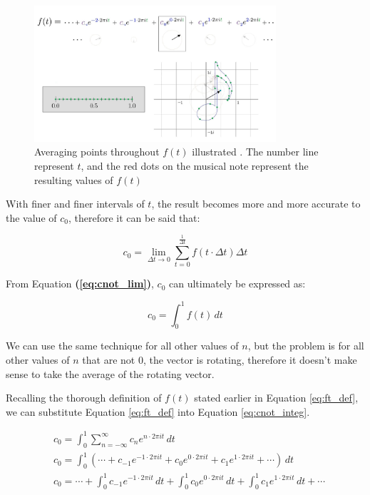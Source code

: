 \documentclass[letterpaper, 12pt]{article}
\begin{document}
\begin{figure}[H]
    \centering
    \includegraphics[width=0.8\textwidth]{cnot_integ.jpeg}
    \caption{Averaging points throughout \protect\(f(t)\) illustrated \protect\cite{sandersonWhatFourierSeries2019}. The number line represent \protect\(t\), and the red dots on the musical note represent the resulting values of \protect\(f(t)\)}
    \label{fig:cnot_integ}
\end{figure}

With finer and finer intervals of \(t\), the result
becomes more and more accurate to the value of \(c_0\), therefore it can be
said that:

\begin{equation}
    c_0 = \lim_{\Delta t \to 0} \sum_{t = 0}^{\frac{1}{\Delta t}} f(t \cdot \Delta t) \Delta t
    \label{eq:cnot_lim}
\end{equation}

From Equation \textbf{(\ref*{eq:cnot_lim})}, \(c_0\) can ultimately be expressed as:

\begin{equation}
    c_0 = \int_{0}^{1} f(t) \,dt
    \label{eq:cnot_integ}
\end{equation}


We can use the same technique for all other values of \(n\), but the problem is
for all other values of \(n\) that are not 0, the vector is rotating, therefore
it doesn't make sense to take the average of the rotating vector.

Recalling the thorough definition of \(f(t)\) stated earlier in Equation \ref*{eq:ft_def},
we can substitute Equation \ref*{eq:ft_def} into Equation \ref*{eq:cnot_integ}.

\begin{align*}
     & c_0 = \int_{0}^{1} \sum_{n=-\infty}^{\infty} c_n e^{n \cdot 2\pi it} \,dt
    \\
     & c_0 = \int_{0}^{1} \left( \cdots + c_{-1} e^{-1 \cdot 2\pi it} + c_{0} e^{0 \cdot 2\pi it} + c_{1} e^{1 \cdot 2\pi it} + \cdots \right) \,dt
    \\
     & c_0 = \cdots + \int_{0}^{1} c_{-1} e^{-1 \cdot 2\pi it} \,dt + \int_{0}^{1} c_{0} e^{0 \cdot 2\pi it} \,dt + \int_{0}^{1} c_{1} e^{1 \cdot 2\pi it} \,dt + \cdots
\end{align*}
\end{document}

